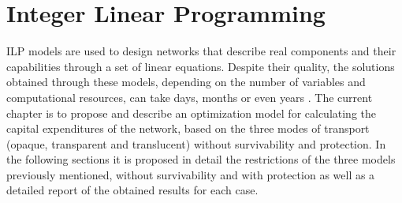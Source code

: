 
\chapter{Integer Linear Programming}
\label{chap_ilp}
ILP models are used to design networks that describe real components and their capabilities through a set of linear equations. Despite their quality, the solutions obtained through these models, depending on the number of variables and computational resources, can take days, months or even years \cite{ILP01}.
The current chapter is to propose and describe an optimization model for calculating the capital expenditures of the network, based on the three modes of transport (opaque, transparent and translucent) without survivability and protection.
In the following sections it is proposed in detail the restrictions of the three models previously mentioned, without survivability and with protection as well as a detailed report of the obtained results for each case.








